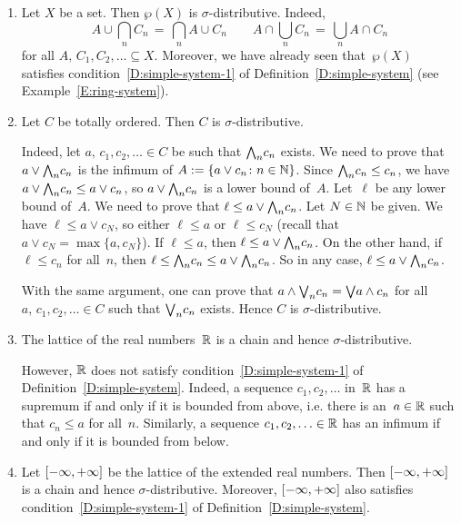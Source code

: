 \documentclass[main.tex]{subfiles}
\begin{document}
\begin{exs}
\begin{enumerate}
\item
Let $X$ be a set. Then $\wp(X)$ is $\sigma$-distributive.
Indeed,  
\begin{equation*}
\textstyle{
A \cup \bigcap_n C_n \,=\, \bigcap_n A \cup C_n
\qquad
A\cap \bigcup_n C_n \,=\, \bigcup_n A \cap C_n}
\end{equation*}
for all $A,\, C_1,C_2,\dotsc \subseteq X$.
Moreover,
we have already seen
that~$\wp(X)$ satisfies condition~\ref{D:simple-system-1}
of Definition~\ref{D:simple-system}
(see Example~\ref{E:ring-system}).
\item
Let $C$ be totally ordered. Then $C$ is $\sigma$-distributive.

Indeed,
let $a,\,c_1,c_2,\dotsc \in C$ be such that $\textstyle{\bigwedge}_n c_n$
exists. We need to prove that $a \vee \textstyle{\bigwedge}_n c_n$ is the 
infimum of $A := \{ a \vee c_n\colon n\in \mathbb{N} \}$.
Since $\textstyle{\bigwedge}_n c_n \leq c_n$,
we have $a \vee \textstyle{\bigwedge}_n c_n \leq a \vee c_n$,
so $a\vee\textstyle{\bigwedge}_n c_n$ is a lower bound of~$A$.
Let~$\ell$
be any lower bound of~$A$.
We need to prove that $\ell \leq a\vee \textstyle{\bigwedge}_n c_n$.
Let $N\in \mathbb{N}$ be given.
We have $\ell \leq a \vee c_N$,
so either $\ell \leq a$ or $\ell \leq c_N$
(recall that $a\vee c_N = \max\{a,c_N\}$).
If $\ell \leq a$, then $\ell \leq a \vee \textstyle{\bigwedge}_n c_n$.
On the other hand,
if $\ell \leq c_n$ for all~$n$,
then $\ell \leq \textstyle{\bigwedge}_n c_n \leq a \vee \textstyle{\bigwedge}_n c_n$.
So in any case,
$\ell \leq a \vee \textstyle{\bigwedge}_n c_n$.

With the same argument,
one can prove that $a \wedge \textstyle{\bigvee}_n c_n = \textstyle{\bigvee} a \wedge c_n$
for all $a,\,c_1,c_2,\dotsc \in C$
such that $\textstyle{\bigvee}_n c_n$ exists.
Hence $C$ is $\sigma$-distributive.

\item
The lattice of the real numbers~$\mathbb{R}$ is a chain
and hence $\sigma$-distributive.

However,
$\mathbb{R}$ does not satisfy condition~\ref{D:simple-system-1}
of Definition~\ref{D:simple-system}.
Indeed,
a sequence $c_1,c_2,\dotsc$ in~$\mathbb{R}$ has a supremum
if and only if it is bounded from above,
i.e. there is an~$a\in \mathbb{R}$ such that $c_n \leq a$
for all~$n$.
Similarly,
a sequence
$c_1,c_2,\dotsc\in \mathbb{R}$ has an infimum
if and only if it is bounded from below.

\item
Let ${[-\infty,+\infty]}$ be the lattice of the extended real numbers.
Then ${[-\infty,+\infty]}$ is a chain and hence $\sigma$-distributive.
Moreover,
${[-\infty,+\infty]}$ also satisfies condition~\ref{D:simple-system-1}
of Definition~\ref{D:simple-system}.


\end{enumerate}
\end{exs}
\end{document}
